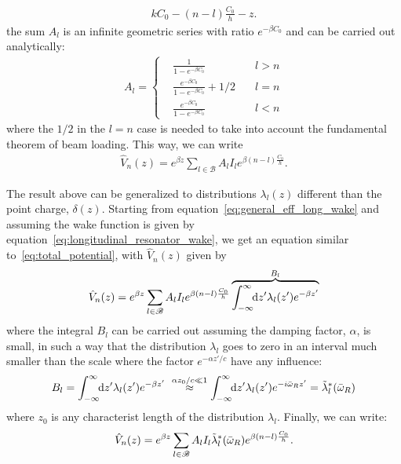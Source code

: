 \begin{apendicesenv}
\begin{align}
        kC_0 -(n-l)\frac{C_0}{h} - z.
    \end{align}
    the sum $A_l$ is an infinite geometric series with ratio $e^{-\beta C_0}$ and can be carried out analytically:
    \begin{align}
        A_l = \left\{\begin{aligned}
                        &\frac{1}{1-e^{-\beta C_0}}\quad &l>n\\
                        &\frac{e^{-\beta C_0}}{1-e^{-\beta C_0}} + 1/2 \quad &l=n\\
                        &\frac{e^{-\beta C_0}}{1-e^{-\beta C_0}}\quad &l<n
                     \end{aligned}
        \right.
    \end{align}
    where the $1/2$ in the $l=n$ case is needed to take into account the fundamental theorem of beam loading. This way, we can write
    \begin{align}\label{eq:}
        \hat{V}_n(z) = e^{\beta z}\sum_{l\in\mathscr{B}}A_l I_l e^{\beta(n-l)\frac{C_0}{h}}.
    \end{align}

    The result above can be generalized to distributions $\lambda_l(z)$ different than the point charge, $\delta(z)$. Starting from equation~\eqref{eq:general_eff_long_wake} and assuming the wake function is given by equation~\eqref{eq:longitudinal_resonator_wake}, we get an equation similar to~\eqref{eq:total_potential}, with $\hat{V}_n(z)$ given by
    \begin{align}
        \hat{V}_n(z) = e^{\beta z}\sum_{l\in\mathscr{B}}A_l I_l e^{\beta(n-l)\frac{C_0}{h}}
                    \overbrace{\int_{-\infty}^{\infty}\!\!\text{d}z' \lambda_l(z') e^{-\beta z'}}^{B_l}
    \end{align}
    where the integral $B_l$ can be carried out assuming the damping factor, $\alpha$, is small, in such a way that the distribution $\lambda_l$ goes to zero in an interval much smaller than the scale where the factor $e^{-\alpha z'/c}$ have any influence:
    \begin{align}
        B_l = \int_{-\infty}^{\infty}\!\!\text{d}z' \lambda_l(z') e^{-\beta z'}\,\, \overset{\alpha z_0/c \ll1}{\approx}
              \int_{-\infty}^{\infty}\!\!\text{d}z' \lambda_l(z') e^{-i\bar{\omega}_R z'} = \tilde{\lambda}^*_l(\bar{\omega}_R)
    \end{align}
    where $z_0$ is any characterist length of the distribution $\lambda_l$. Finally, we can write:
    \begin{align}
        \hat{V}_n(z) = e^{\beta z}\sum_{l\in\mathscr{B}}A_l I_l \tilde{\lambda}^*_l(\bar{\omega}_R) e^{\beta(n-l)\frac{C_0}{h}}.
    \end{align}


\end{apendicesenv}
